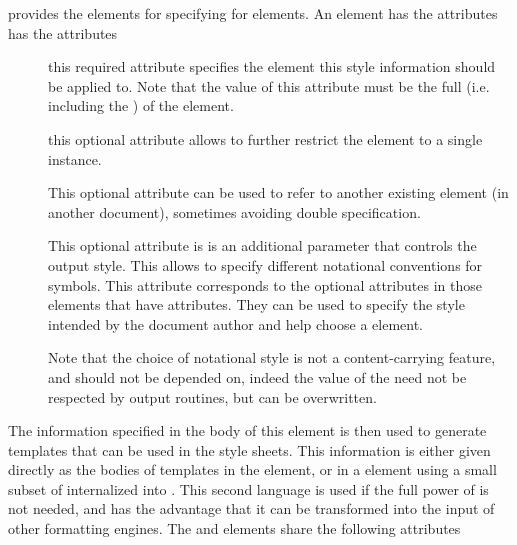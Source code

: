 {\omdoc} provides the {} elements for specifying {} for {\omdoc} elements.  An
{} element has the attributes has the attributes
\begin{description}
\item[{}] this required attribute specifies the
  {\omdoc} element this style information should be applied to. Note that the
  value of this attribute must be the full {} (i.e. including the {}) of the
  element.
\item[{}] this optional attribute allows to further
  restrict the {\omdoc} element to a single instance.
\item[{}] This optional attribute can be used to
  refer to another existing {} element (in another document),
  sometimes avoiding double specification.
\item[{}] This optional attribute is is an
  additional parameter that controls the output style. This allows to specify
  different notational conventions for symbols. This attribute corresponds to the
  optional {} attributes in those {\omdoc} elements that have
  {} attributes. They can be used to specify the style intended
  by the document author and help choose a {} element.
  
  Note that the choice of notational style is not a content-carrying feature, and
  should not be depended on, indeed the value of the
  {} need not be respected by output routines, but
  can be overwritten.
\end{description}
The information specified in the body of this element is then used to generate
{\xslt} templates that can be used in the style sheets. This information is either
given directly as the bodies of {\xslt} templates in the {} element,
or in a {} element using a small subset of {\xslt} internalized into
{\omdoc}. This second language is used if the full power of {\xslt} is not needed,
and has the advantage that it can be transformed into the input of other
formatting engines. The {} and {} elements share the
following attributes
